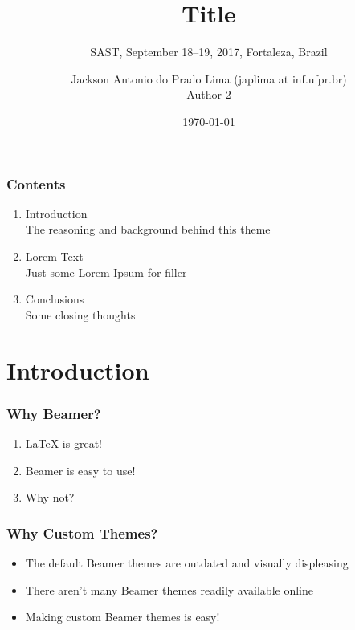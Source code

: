 \documentclass[aspectratio=169]{beamer}
\title{Title}
\author{Jackson Antonio do Prado Lima (japlima at inf.ufpr.br) \\ Author 2}
\date{\today}
\subtitle{\tiny{SAST, September 18--19, 2017, Fortaleza, Brazil}}
\begin{document}
	\setcounter{showProgressBar}{0}
	\setcounter{showSlideNumbers}{0}

	\frame{\titlepage}

	\begin{frame}		
		\frametitle{Contents}
		\begin{enumerate}
			\item Introduction \\ \textcolor{ExecusharesGrey}{\footnotesize\hspace{1em} The reasoning and background behind this theme}
			\item Lorem Text  \\ \textcolor{ExecusharesGrey}{\footnotesize\hspace{1em} Just some Lorem Ipsum for filler}
			\item Conclusions \\ \textcolor{ExecusharesGrey}{\footnotesize\hspace{1em} Some closing thoughts}
		\end{enumerate}
	\end{frame}

	\setcounter{framenumber}{0}
	\setcounter{showProgressBar}{1}
	\setcounter{showSlideNumbers}{1}
	
	\section{Introduction}
		\begin{frame}
			\frametitle{Why Beamer?}
			\begin{enumerate}
				\item LaTeX is great!
				\item Beamer is easy to use!
				\item Why not?
			\end{enumerate}
		\end{frame}

		\begin{frame}
			\frametitle{Why Custom Themes?}
			\begin{itemize}
				\item The default Beamer themes are outdated and visually displeasing
				\item There aren't many Beamer themes readily available online
				\item Making custom Beamer themes is easy!
			\end{itemize}
		\end{frame}
\end{document}
